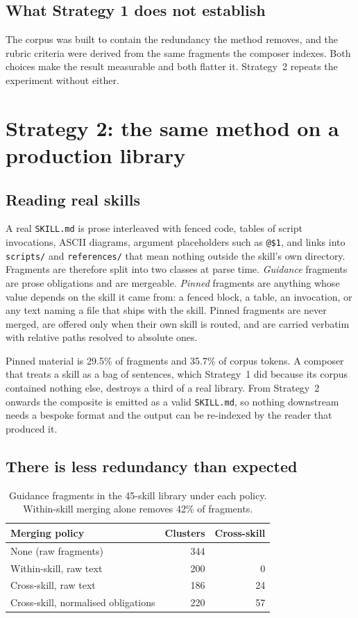 \documentclass[11pt]{article}
\begin{document}
\subsection{What Strategy 1 does not establish}

The corpus was built to contain the redundancy the method removes, and the rubric criteria were
derived from the same fragments the composer indexes. Both choices make the result measurable and
both flatter it. Strategy~2 repeats the experiment without either.

\section{Strategy 2: the same method on a production library}
\label{sec:s2}

\subsection{Reading real skills}

A real \texttt{SKILL.md} is prose interleaved with fenced code, tables of script invocations, ASCII
diagrams, argument placeholders such as \texttt{@\$1}, and links into \texttt{scripts/} and
\texttt{references/} that mean nothing outside the skill's own directory. Fragments are therefore
split into two classes at parse time. \emph{Guidance} fragments are prose obligations and are
mergeable. \emph{Pinned} fragments are anything whose value depends on the skill it came from: a
fenced block, a table, an invocation, or any text naming a file that ships with the skill. Pinned
fragments are never merged, are offered only when their own skill is routed, and are carried
verbatim with relative paths resolved to absolute ones.

Pinned material is 29.5\% of fragments and 35.7\% of corpus tokens. A composer that treats a skill
as a bag of sentences, which Strategy~1 did because its corpus contained nothing else, destroys a
third of a real library. From Strategy~2 onwards the composite is emitted as a valid
\texttt{SKILL.md}, so nothing downstream needs a bespoke format and the output can be re-indexed by
the reader that produced it.

\subsection{There is less redundancy than expected}

\begin{table}[h]\centering\small
\begin{tabular}{lrr}
\toprule
Merging policy & Clusters & Cross-skill \\
\midrule
None (raw fragments) & 344 & \\
Within-skill, raw text & 200 & 0 \\
Cross-skill, raw text & 186 & 24 \\
Cross-skill, normalised obligations & 220 & 57 \\
\bottomrule
\end{tabular}
\caption{Guidance fragments in the 45-skill library under each policy. Within-skill merging alone
removes 42\% of fragments.}
\label{tab:s2red}
\end{table}
\end{document}
